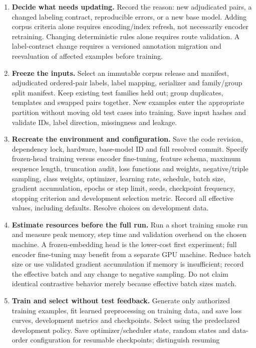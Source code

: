 \documentclass[10pt,letterpaper]{article}
\begin{document}
\begin{enumerate}
\item \textbf{Decide what needs updating.} Record the reason: new adjudicated
pairs, a changed labeling contract, reproducible errors, or a new base model.
Adding corpus criteria alone requires encoding/index refresh, not necessarily
encoder retraining. Changing deterministic rules alone requires route
validation. A label-contract change requires a versioned annotation migration
and reevaluation of affected examples before training.
\item \textbf{Freeze the inputs.} Select an immutable corpus release and
manifest, adjudicated ordered-pair labels, label mapping, serializer and
family/group split manifest. Keep existing test families held out; group
duplicates, templates and swapped pairs together. New examples enter the
appropriate partition without moving old test cases into training. Save
input hashes and validate IDs, label direction, missingness and leakage.
\item \textbf{Recreate the environment and configuration.} Save the code
revision, dependency lock, hardware, base-model ID and full resolved commit.
Specify frozen-head training versus encoder fine-tuning, feature schema,
maximum sequence length, truncation audit, loss functions and weights,
negative/triple sampling, class weights, optimizer, learning rate, schedule,
batch size, gradient accumulation, epochs or step limit, seeds, checkpoint
frequency, stopping criterion and development selection metric. Record all
effective values, including defaults. Resolve choices on development data.
\item \textbf{Estimate resources before the full run.} Run a short training
smoke run and measure peak memory, step time and validation overhead on the
chosen machine. A frozen-embedding head is the lower-cost first experiment;
full encoder fine-tuning may benefit from a separate GPU machine. Reduce
batch size or use validated gradient accumulation if memory is insufficient;
record the effective batch and any change to negative sampling. Do not claim
identical contrastive behavior merely because effective batch sizes match.
\item \textbf{Train and select without test feedback.} Generate only
authorized training examples, fit learned preprocessing on training data,
and save loss curves, development metrics and checkpoints. Select using the
predeclared development policy. Save optimizer/scheduler state, random states
and data-order configuration for resumable checkpoints; distinguish resuming

\end{enumerate}
\end{document}

